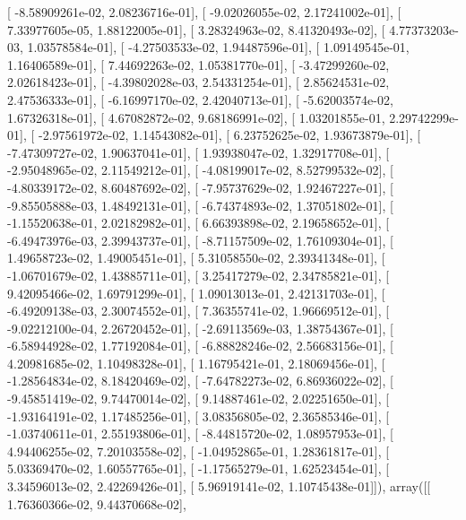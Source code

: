 \documentclass{article}
\begin{document}
       [ -8.58909261e-02,   2.08236716e-01],
       [ -9.02026055e-02,   2.17241002e-01],
       [  7.33977605e-05,   1.88122005e-01],
       [  3.28324963e-02,   8.41320493e-02],
       [  4.77373203e-03,   1.03578584e-01],
       [ -4.27503533e-02,   1.94487596e-01],
       [  1.09149545e-01,   1.16406589e-01],
       [  7.44692263e-02,   1.05381770e-01],
       [ -3.47299260e-02,   2.02618423e-01],
       [ -4.39802028e-03,   2.54331254e-01],
       [  2.85624531e-02,   2.47536333e-01],
       [ -6.16997170e-02,   2.42040713e-01],
       [ -5.62003574e-02,   1.67326318e-01],
       [  4.67082872e-02,   9.68186991e-02],
       [  1.03201855e-01,   2.29742299e-01],
       [ -2.97561972e-02,   1.14543082e-01],
       [  6.23752625e-02,   1.93673879e-01],
       [ -7.47309727e-02,   1.90637041e-01],
       [  1.93938047e-02,   1.32917708e-01],
       [ -2.95048965e-02,   2.11549212e-01],
       [ -4.08199017e-02,   8.52799532e-02],
       [ -4.80339172e-02,   8.60487692e-02],
       [ -7.95737629e-02,   1.92467227e-01],
       [ -9.85505888e-03,   1.48492131e-01],
       [ -6.74374893e-02,   1.37051802e-01],
       [ -1.15520638e-01,   2.02182982e-01],
       [  6.66393898e-02,   2.19658652e-01],
       [ -6.49473976e-03,   2.39943737e-01],
       [ -8.71157509e-02,   1.76109304e-01],
       [  1.49658723e-02,   1.49005451e-01],
       [  5.31058550e-02,   2.39341348e-01],
       [ -1.06701679e-02,   1.43885711e-01],
       [  3.25417279e-02,   2.34785821e-01],
       [  9.42095466e-02,   1.69791299e-01],
       [  1.09013013e-01,   2.42131703e-01],
       [ -6.49209138e-03,   2.30074552e-01],
       [  7.36355741e-02,   1.96669512e-01],
       [ -9.02212100e-04,   2.26720452e-01],
       [ -2.69113569e-03,   1.38754367e-01],
       [ -6.58944928e-02,   1.77192084e-01],
       [ -6.88828246e-02,   2.56683156e-01],
       [  4.20981685e-02,   1.10498328e-01],
       [  1.16795421e-01,   2.18069456e-01],
       [ -1.28564834e-02,   8.18420469e-02],
       [ -7.64782273e-02,   6.86936022e-02],
       [ -9.45851419e-02,   9.74470014e-02],
       [  9.14887461e-02,   2.02251650e-01],
       [ -1.93164191e-02,   1.17485256e-01],
       [  3.08356805e-02,   2.36585346e-01],
       [ -1.03740611e-01,   2.55193806e-01],
       [ -8.44815720e-02,   1.08957953e-01],
       [  4.94406255e-02,   7.20103558e-02],
       [ -1.04952865e-01,   1.28361817e-01],
       [  5.03369470e-02,   1.60557765e-01],
       [ -1.17565279e-01,   1.62523454e-01],
       [  3.34596013e-02,   2.42269426e-01],
       [  5.96919141e-02,   1.10745438e-01]]), array([[  1.76360366e-02,   9.44370668e-02],
\end{document}
